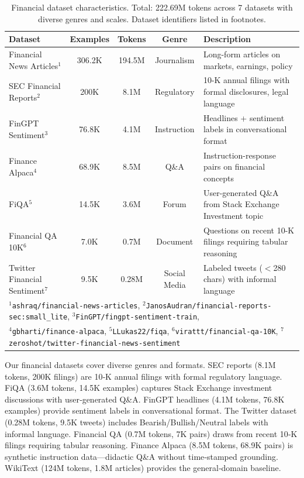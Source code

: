 \begin{table}[h]
\centering
\caption[Financial Dataset Characteristics]{Financial dataset characteristics. Total: 222.69M tokens across 7 datasets with diverse genres and scales. Dataset identifiers listed in footnotes.}
\label{tab:financial_datasets}
\small
\begin{tabular}{p{3.4cm}cccp{5.5cm}}
\toprule
\textbf{Dataset} & \textbf{Examples} & \textbf{Tokens} & \textbf{Genre} & \textbf{Description} \\
\midrule
Financial News Articles$^1$ & 306.2K & 194.5M & Journalism & Long-form articles on markets, earnings, policy \\
\midrule
SEC Financial Reports$^2$ & 200K & 8.1M & Regulatory & 10-K annual filings with formal disclosures, legal language \\
\midrule
FinGPT Sentiment$^3$ & 76.8K & 4.1M & Instruction & Headlines + sentiment labels in conversational format \\
\midrule
Finance Alpaca$^4$ & 68.9K & 8.5M & Q\&A & Instruction-response pairs on financial concepts \\
\midrule
FiQA$^5$ & 14.5K & 3.6M & Forum & User-generated Q\&A from Stack Exchange Investment topic \\
\midrule
Financial QA 10K$^6$ & 7.0K & 0.7M & Document & Questions on recent 10-K filings requiring tabular reasoning \\
\midrule
Twitter Financial Sentiment$^7$ & 9.5K & 0.28M & Social Media & Labeled tweets ($<$280 chars) with informal language \\
\bottomrule
\multicolumn{5}{l}{\footnotesize $^1$\texttt{ashraq/financial-news-articles}, $^2$\texttt{JanosAudran/financial-reports-sec:small\_lite}, $^3$\texttt{FinGPT/fingpt-sentiment-train},} \\
\multicolumn{5}{l}{\footnotesize $^4$\texttt{gbharti/finance-alpaca}, $^5$\texttt{LLukas22/fiqa}, $^6$\texttt{virattt/financial-qa-10K}, $^7$\texttt{zeroshot/twitter-financial-news-sentiment}}
\end{tabular}
\end{table}

Our financial datasets cover diverse genres and formats. SEC reports (8.1M tokens, 200K filings) are 10‑K annual filings with formal regulatory language. FiQA (3.6M tokens, 14.5K examples) captures Stack Exchange investment discussions with user‑generated Q\&A. FinGPT headlines (4.1M tokens, 76.8K examples) provide sentiment labels in conversational format. The Twitter dataset (0.28M tokens, 9.5K tweets) includes Bearish/Bullish/Neutral labels with informal language. Financial QA (0.7M tokens, 7K pairs) draws from recent 10‑K filings requiring tabular reasoning. Finance Alpaca (8.5M tokens, 68.9K pairs) is synthetic instruction data—didactic Q\&A without time‑stamped grounding. WikiText (124M tokens, 1.8M articles) provides the general‑domain baseline.

